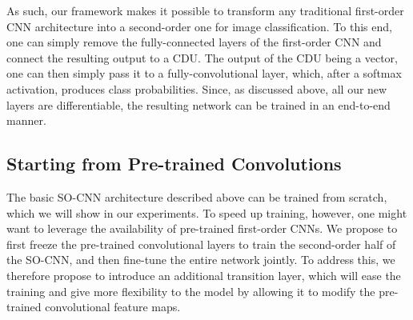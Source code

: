 As such, our framework makes it possible to transform any traditional first-order CNN architecture into a second-order one for image classification. To this end, one can simply remove the fully-connected layers of the first-order CNN and connect the resulting output to a CDU. The output of the CDU being a vector, one can then simply pass it to a fully-convolutional layer, which, after a softmax activation, produces class probabilities. Since, as discussed above, all our new layers are differentiable, the resulting network can be trained in an end-to-end manner.





\subsection{Starting from Pre-trained Convolutions}
\label{sec:transition}
The basic SO-CNN architecture described above can be trained from scratch, which we will show in our experiments. To speed up training, however, one might want to leverage the availability of pre-trained first-order CNNs. We propose to first freeze the pre-trained convolutional layers to train the second-order half of the SO-CNN, and then fine-tune the entire network jointly.
To address this, we therefore propose to introduce an additional transition layer, which will ease the training and give more flexibility to the model by allowing it to modify the pre-trained convolutional feature maps.

